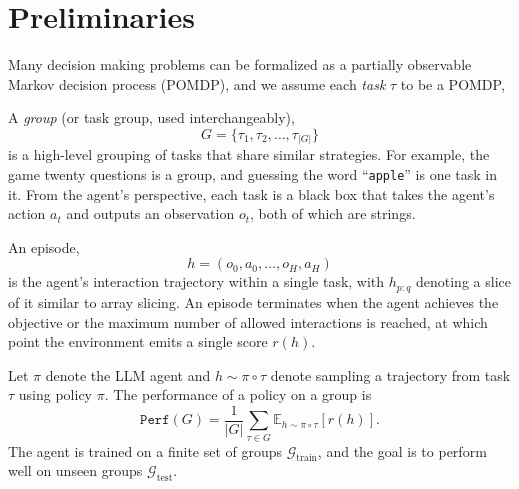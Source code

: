 \documentclass[manuscript,review]{acmart}
\begin{document}
{%
\section{Preliminaries}{
Many decision making problems can be formalized as a partially observable Markov decision process (POMDP), 
and we assume each \emph{task} $\tau$ to be a POMDP,

A \emph{group} (or task group, used interchangeably), $$G = \{\tau_1, \tau_2, \dots, \tau_{|G|}\}$$ 
is a high-level grouping of tasks that share similar strategies. For example,
the game twenty questions is a group, and guessing the word ``\texttt{apple}'' is one task in it. 
From the agent's perspective, each task is a black box that takes the agent's action $a_t$ and 
outputs an observation $o_t$, both of which are strings. 

An episode, $$h = (o_0, a_0, \dots, o_H, a_H)$$ is the
agent's interaction trajectory within a single task, with $h_{p:q}$ denoting a slice of it
similar to array slicing. An episode terminates when the agent achieves the objective or
the maximum number of allowed interactions is reached, at which point the environment
emits a single score $r(h)$.

Let $\pi$ denote the LLM agent and $h \sim \pi \circ \tau$
denote sampling a trajectory from task $\tau$ using policy $\pi$. The performance of a
policy on a group is
\begin{equation}
    \texttt{Perf}(G) = \frac{1}{|G|}\sum_{\tau \in G} \mathbb{E}_{h\sim \pi \circ \tau}[r(h)].
\end{equation}
The agent is trained on a finite set of groups $\mathcal{G}_\text{train}$, and the goal is
to perform well on unseen groups $\mathcal{G}_\text{test}$.
}
}
\end{document}
